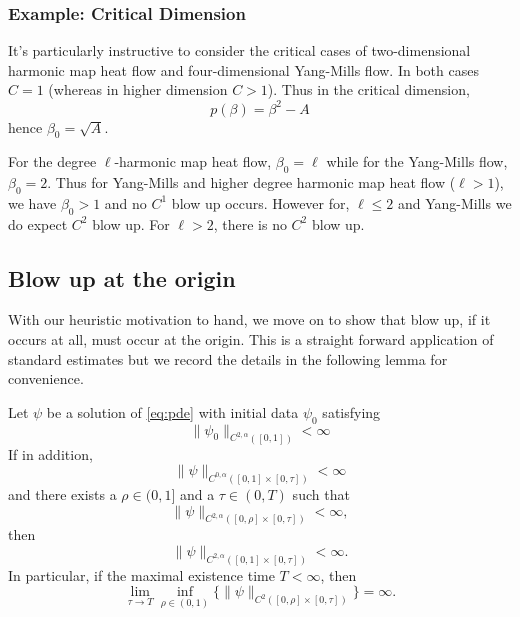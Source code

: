 \documentclass{amsart}
\begin{document}
\subsubsection*{Example: Critical Dimension}

It's particularly instructive to consider the critical cases of two-dimensional harmonic map heat flow and four-dimensional Yang-Mills flow. In both cases \(C = 1\) (whereas in higher dimension \(C > 1\)). Thus in the critical dimension,
\[
p(\beta) = \beta^2 - A
\]
hence \(\beta_0 = \sqrt{A}\).

For the degree \(\ell\)-harmonic map heat flow, \(\beta_0 = \ell\) while for the Yang-Mills flow, \(\beta_0 = 2\). Thus for Yang-Mills and higher degree harmonic map heat flow (\(\ell > 1\)), we have \(\beta_0 > 1\) and no \(C^1\) blow up occurs. However for, \(\ell \leq 2\) and Yang-Mills we do expect \(C^2\) blow up. For \(\ell > 2\), there is no \(C^2\) blow up.

\subsection{Blow up at the origin}

With our heuristic motivation to hand, we move on to show that blow up, if it occurs at all, must occur at the origin. This is a straight forward application of standard estimates \cite[Theorem 10.1]{Ladyzhenskaja:/1967} but we record the details in the following lemma for convenience.

\begin{lemma}
\label{lem:apriori_bounds}
Let \(\psi\) be a solution of \eqref{eq:pde} with initial data \(\psi_0\) satisfying
\[
\|\psi_0\|_{C^{2,\alpha}([0, 1])} < \infty
\]
If in addition,
\[
\|\psi\|_{C^{0,\alpha}([0, 1] \times [0, \tau])} < \infty
\]
and there exists a \(\rho \in (0, 1]\) and a \(\tau \in (0, T)\) such that
\[
\|\psi\|_{C^{2,\alpha}([0, \rho] \times [0, \tau])} < \infty,
\]
then
\[
\|\psi\|_{C^{2,\alpha}([0, 1] \times [0, \tau])} < \infty.
\]
In particular, if the maximal existence time \(T < \infty\), then
\[
\lim_{\tau\to T} \inf_{\rho \in (0, 1)} \{\|\psi\|_{C^2([0, \rho] \times [0, \tau])}\} = \infty.
\]
\end{lemma}
\end{document}
